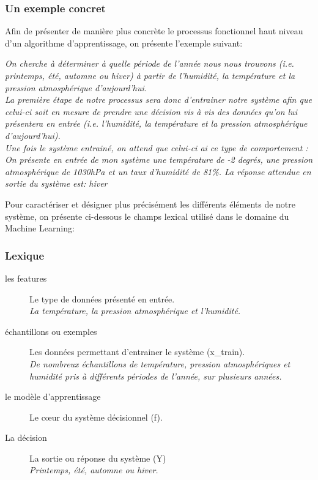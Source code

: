 \subsubsection{Un exemple concret}
\label{Le Machine Learning: Généralités sur le Machine Learning: Définition et principe général:un exemple concret}
Afin de présenter de manière plus concrète le processus fonctionnel haut niveau d'un algorithme d'apprentissage, on présente l'exemple suivant:

\textit{On cherche à déterminer à quelle période de l'année nous nous trouvons (i.e. printemps, été, automne ou hiver) à partir de l'humidité, la température et la pression atmosphérique d'aujourd'hui. \\
	La première étape de notre processus sera donc d'entrainer notre système afin que celui-ci soit en mesure de prendre une décision vis à vis des données qu'on lui présentera en entrée (i.e. l'humidité, la température et la pression atmosphérique d'aujourd'hui). \\
	Une fois le système entrainé, on attend que celui-ci ai ce type de comportement : \\
	On présente en entrée de mon système une température de -2 degrés, une pression atmosphérique de 1030hPa et un taux d'humidité de 81\%. La réponse attendue en sortie du système est: hiver}

Pour caractériser et  désigner plus précisément les différents éléments de notre système, on présente ci-dessous le champs lexical utilisé dans le domaine du Machine Learning:

\subsubsection{Lexique} 
\begin{description}
	\item [les features] Le type de données présenté en entrée. \\
	\textit{La température, la pression atmosphérique et l'humidité.}
	\item [échantillons ou exemples] Les données permettant d'entrainer le système (x\_train). \\
	\textit{De nombreux échantillons de température, pression atmosphériques et humidité pris à différents périodes de l'année, sur plusieurs années.}
	\item [le modèle d'apprentissage] Le cœur du système décisionnel (f).
	\item [La décision] La sortie ou réponse du système (Y) \\
	\textit{Printemps, été, automne ou hiver.}
\end{description}


